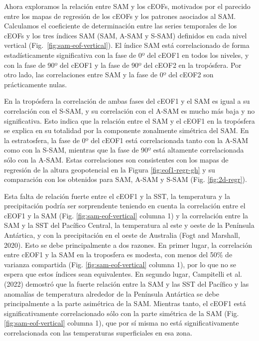 \documentclass[12pt,oneside]{reedthesis}
\begin{document}
Ahora exploramos la relación entre SAM y los cEOFs, motivados por el parecido entre los mapas de regresión de los cEOFs y los patrones asociados al SAM.
Calculamos el coeficiente de determinación entre las series temporales de los cEOFs y los tres índices SAM (SAM, A-SAM y S-SAM) definidos en cada nivel vertical (Fig.~\ref{fig:sam-eof-vertical}).
El índice SAM está correlacionado de forma estadísticamente significativa con la fase de 0º del cEOF1 en todos los niveles, y con la fase de 90º del cEOF1 y la fase de 90º del cEOF2 en la tropósfera.
Por otro lado, las correlaciones entre SAM y la fase de 0º del cEOF2 son prácticamente nulas.

En la tropósfera la correlación de ambas fases del cEOF1 y el SAM es igual a su correlación con el S-SAM, y su correlación con el A-SAM es mucho más baja y no significativa.
Esto indica que la relación entre el SAM y el cEOF1 en la tropósfera se explica en su totalidad por la componente zonalmente simétrica del SAM.
En la estratosfera, la fase de 0º del cEOF1 está correlacionada tanto con la A-SAM como con la S-SAM, mientras que la fase de 90º está altamente correlacionada sólo con la A-SAM.
Estas correlaciones son consistentes con los mapas de regresión de la altura geopotencial en la Figura \ref{fig:eof1-regr-gh} y su comparación con los obtenidos para SAM, A-SAM y S-SAM (Fig. \ref{fig:2d-regr}).

Esta falta de relación fuerte entre el cEOF1 y la SST, la temperatura y la precipitación podría ser sorprendente teniendo en cuenta la correlación entre el cEOF1 y la SAM (Fig. \ref{fig:sam-eof-vertical} columna 1) y la correlación entre la SAM y la SST del Pacífico Central, la temperatura al este y oeste de la Península Antártica, y con la precipitación en el oeste de Australia (Fogt and Marshall, 2020).
Esto se debe principalmente a dos razones.
En primer lugar, la correlación entre cEOF1 y la SAM en la troposfera es modesta, con menos del 50\% de varianza compartida (Fig. \ref{fig:sam-eof-vertical} columna 1), por lo que no se espera que estos índices sean equivalentes.
En segundo lugar, Campitelli et al. (2022) demostró que la fuerte relación entre la SAM y las SST del Pacífico y las anomalías de temperatura alrededor de la Península Antártica se debe principalmente a la parte asimétrica de la SAM.
Mientras tanto, el cEOF1 está significativamente correlacionado sólo con la parte simétrica de la SAM (Fig. \ref{fig:sam-eof-vertical} columna 1), que por sí misma no está significativamente correlacionada con las temperaturas superficiales en esa zona.
\end{document}
